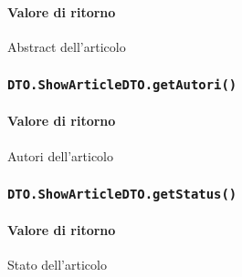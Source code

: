 \paragraph{Valore di ritorno}
\begin{description}
\item Abstract dell'articolo
\end{description}
\subsubsection{\texttt{DTO.ShowArticleDTO.getAutori()}}
\paragraph{Valore di ritorno}
\begin{description}
\item Autori dell'articolo
\end{description}
\subsubsection{\texttt{DTO.ShowArticleDTO.getStatus()}}
\paragraph{Valore di ritorno}
\begin{description}
\item Stato dell'articolo
\end{description}




